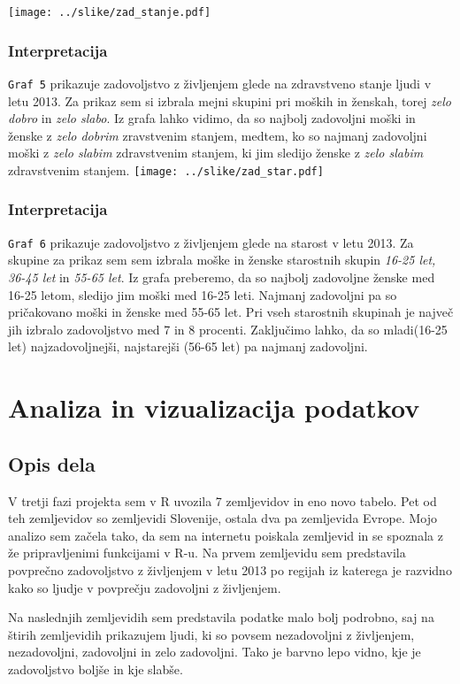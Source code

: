 \documentclass[11pt,a4paper]{article}
\begin{document}
 \texttt{[image: ../slike/zad\_stanje.pdf]}

\subsubsection{Interpretacija}
\verb+Graf 5+ prikazuje zadovoljstvo z življenjem glede na zdravstveno stanje ljudi v letu 2013. Za prikaz sem si izbrala mejni skupini pri moških in ženskah, torej \textit{zelo dobro} in \textit{zelo slabo}.  Iz grafa lahko vidimo, da so najbolj zadovoljni moški in ženske z \textit{zelo dobrim} zravstvenim stanjem, medtem, ko so najmanj zadovoljni moški z \textit{zelo slabim} zdravstvenim stanjem, ki jim sledijo ženske z \textit{zelo slabim} zdravstvenim stanjem.
\texttt{[image: ../slike/zad\_star.pdf]}
\subsubsection{Interpretacija}
\verb+Graf 6+ prikazuje zadovoljstvo z življenjem glede na starost v letu 2013. Za skupine za prikaz sem sem izbrala moške in ženske starostnih skupin \textit{16-25 let, 36-45 let} in \textit{55-65 let}. Iz grafa preberemo, da so najbolj zadovoljne ženske med 16-25 letom, sledijo jim moški med 16-25 leti. Najmanj zadovoljni pa so pričakovano moški in ženske med 55-65 let. Pri vseh starostnih skupinah je največ jih izbralo zadovoljstvo med 7 in 8 procenti. Zaključimo lahko, da so mladi(16-25 let) najzadovoljnejši, najstarejši (56-65 let) pa najmanj zadovoljni.
\section{Analiza in vizualizacija podatkov}
\subsection{Opis dela}
V tretji fazi projekta sem v R uvozila 7 zemljevidov in eno novo tabelo. Pet od teh zemljevidov so zemljevidi Slovenije, ostala dva pa zemljevida Evrope. Mojo analizo sem začela tako, da sem na internetu poiskala zemljevid in se spoznala z že pripravljenimi funkcijami v R-u. Na prvem zemljevidu sem predstavila povprečno zadovoljstvo z življenjem v letu 2013 po regijah iz katerega je razvidno kako so ljudje v povprečju zadovoljni z življenjem.

Na naslednjih zemljevidih sem predstavila podatke malo bolj podrobno, saj na štirih zemljevidih prikazujem ljudi, ki so povsem nezadovoljni z življenjem, nezadovoljni, zadovoljni in zelo zadovoljni. Tako je barvno lepo vidno, kje je zadovoljstvo boljše in kje slabše.
\end{document}
